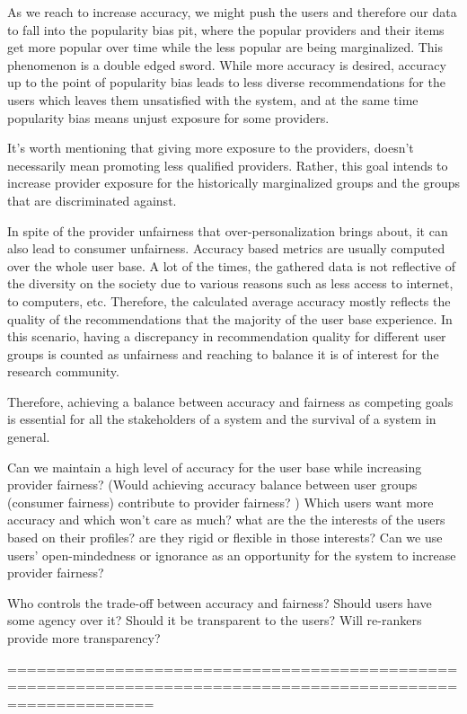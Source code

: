 As we reach to increase accuracy, we might push the users and therefore our data to fall into the popularity bias pit, where the popular providers and their items get more popular over time while the less popular are being marginalized. This phenomenon is a double edged sword. While more accuracy is desired, accuracy up to the point of popularity bias leads to less diverse recommendations for the users which leaves them unsatisfied with the system, and at the same time popularity bias means unjust exposure for some providers.

It's worth mentioning that giving more exposure to the providers, doesn't necessarily mean promoting less qualified providers. Rather, this goal intends to increase provider exposure for the historically marginalized groups and the groups that are discriminated against.

In spite of the provider unfairness that over-personalization brings about, it can also lead to consumer unfairness. Accuracy based metrics are usually computed over the whole user base. A lot of the times, the gathered data is not reflective of the diversity on the society due to various reasons such as less access to internet, to computers, etc. Therefore, the calculated average accuracy mostly reflects the quality of the recommendations that the majority of the user base experience. In this scenario, having a discrepancy in recommendation quality for different user groups is counted as unfairness and reaching to balance it is of interest for the research community.


Therefore, achieving a balance between accuracy and fairness as competing goals is essential for all the stakeholders of a system and the survival of a system in general.


Can we maintain a high level of accuracy for the user base while increasing provider fairness?
 (Would achieving accuracy balance between user groups (consumer fairness) contribute to provider fairness? )
 Which users want more accuracy and which won't care as much? what are the the interests of the users based on their profiles? are they rigid or flexible in those interests? Can we use users' open-mindedness or ignorance as an opportunity for the system to increase provider fairness?
 
 
Who controls the trade-off between accuracy and fairness? Should users have some agency over it? Should it be transparent to the users? Will re-rankers provide more transparency?



===========================================================================================================






    







